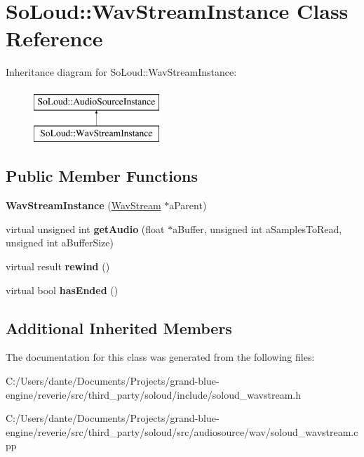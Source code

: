 \hypertarget{class_so_loud_1_1_wav_stream_instance}{}\section{So\+Loud\+::Wav\+Stream\+Instance Class Reference}
\label{class_so_loud_1_1_wav_stream_instance}
Inheritance diagram for So\+Loud\+::Wav\+Stream\+Instance\+:\begin{figure}[H]
\begin{center}
\leavevmode
\includegraphics[height=2.000000cm]{class_so_loud_1_1_wav_stream_instance}
\end{center}
\end{figure}
\subsection*{Public Member Functions}
\begin{DoxyCompactItemize}
\item 
\mbox{\label{class_so_loud_1_1_wav_stream_instance_a2c28700b138633763722906d90a27b87}} 
{\bfseries Wav\+Stream\+Instance} (\mbox{\hyperlink{class_so_loud_1_1_wav_stream}{Wav\+Stream}} $\ast$a\+Parent)
\item 
\mbox{\label{class_so_loud_1_1_wav_stream_instance_a13917e295fbbeca35238cc8dc37f16c7}} 
virtual unsigned int {\bfseries get\+Audio} (float $\ast$a\+Buffer, unsigned int a\+Samples\+To\+Read, unsigned int a\+Buffer\+Size)
\item 
\mbox{\label{class_so_loud_1_1_wav_stream_instance_ab9469c2ae985e390098c32809bed88cc}} 
virtual result {\bfseries rewind} ()
\item 
\mbox{\label{class_so_loud_1_1_wav_stream_instance_af617f24319b60deacd6834f63ca3c8d3}} 
virtual bool {\bfseries has\+Ended} ()
\end{DoxyCompactItemize}
\subsection*{Additional Inherited Members}


The documentation for this class was generated from the following files\+:\begin{DoxyCompactItemize}
\item 
C\+:/\+Users/dante/\+Documents/\+Projects/grand-\/blue-\/engine/reverie/src/third\+\_\+party/soloud/include/soloud\+\_\+wavstream.\+h\item 
C\+:/\+Users/dante/\+Documents/\+Projects/grand-\/blue-\/engine/reverie/src/third\+\_\+party/soloud/src/audiosource/wav/soloud\+\_\+wavstream.\+cpp\end{DoxyCompactItemize}
